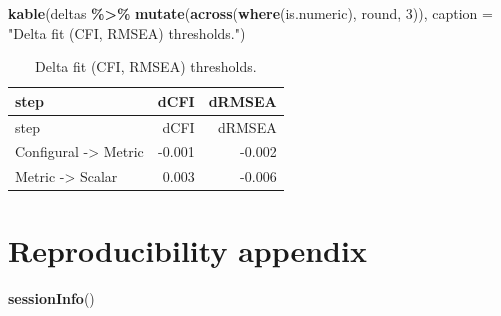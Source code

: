 \documentclass[
  10pt,
]{article}
\newenvironment{Shaded}{\begin{snugshade}}{\end{snugshade}}
\newcommand{\AttributeTok}[1]{\textcolor[rgb]{0.13,0.29,0.53}{#1}}
\newcommand{\DecValTok}[1]{\textcolor[rgb]{0.00,0.00,0.81}{#1}}
\newcommand{\FunctionTok}[1]{\textcolor[rgb]{0.13,0.29,0.53}{\textbf{#1}}}
\newcommand{\NormalTok}[1]{#1}
\newcommand{\SpecialCharTok}[1]{\textcolor[rgb]{0.81,0.36,0.00}{\textbf{#1}}}
\newcommand{\StringTok}[1]{\textcolor[rgb]{0.31,0.60,0.02}{#1}}
\begin{document}
\begin{Shaded}
\begin{Highlighting}[]
\FunctionTok{kable}\NormalTok{(deltas }\SpecialCharTok{\%\textgreater{}\%} \FunctionTok{mutate}\NormalTok{(}\FunctionTok{across}\NormalTok{(}\FunctionTok{where}\NormalTok{(is.numeric), round, }\DecValTok{3}\NormalTok{)), }
      \AttributeTok{caption =} \StringTok{"Delta fit (CFI, RMSEA) thresholds."}\NormalTok{)}
\end{Highlighting}
\end{Shaded}

\begin{longtable}[]{@{}lrr@{}}
\caption{Delta fit (CFI, RMSEA) thresholds.}\tabularnewline
\toprule\noalign{}
step & dCFI & dRMSEA \\
\midrule\noalign{}
\endfirsthead
\toprule\noalign{}
step & dCFI & dRMSEA \\
\midrule\noalign{}
\endhead
\bottomrule\noalign{}
\endlastfoot
Configural -\textgreater{} Metric & -0.001 & -0.002 \\
Metric -\textgreater{} Scalar & 0.003 & -0.006 \\
\end{longtable}

\hypertarget{reproducibility-appendix}{%
\section{Reproducibility appendix}\label{reproducibility-appendix}}

\begin{Shaded}
\begin{Highlighting}[]
\FunctionTok{sessionInfo}\NormalTok{()}
\end{Highlighting}
\end{Shaded}
\end{document}
